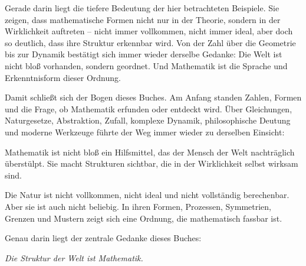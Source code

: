 Gerade darin liegt die tiefere Bedeutung der hier betrachteten Beispiele.
Sie zeigen,
dass mathematische Formen nicht nur in der Theorie,
sondern in der Wirklichkeit auftreten --
nicht immer vollkommen,
nicht immer ideal,
aber doch so deutlich,
dass ihre Struktur erkennbar wird.
Von der Zahl über die Geometrie bis zur Dynamik bestätigt sich immer wieder derselbe Gedanke:
Die Welt ist nicht bloß vorhanden,
sondern geordnet.
Und Mathematik ist die Sprache und Erkenntnisform dieser Ordnung.

\medskip

Damit schließt sich der Bogen dieses Buches.
Am Anfang standen Zahlen,
Formen
und die Frage,
ob Mathematik erfunden oder entdeckt wird.
Über Gleichungen,
Naturgesetze,
Abstraktion,
Zufall,
komplexe Dynamik,
philosophische Deutung
und moderne Werkzeuge führte der Weg immer wieder zu derselben Einsicht:

Mathematik ist nicht bloß ein Hilfsmittel,
das der Mensch der Welt nachträglich überstülpt.
Sie macht Strukturen sichtbar,
die in der Wirklichkeit selbst wirksam sind.

Die Natur ist nicht vollkommen,
nicht ideal
und nicht vollständig berechenbar.
Aber sie ist auch nicht beliebig.
In ihren Formen,
Prozessen,
Symmetrien,
Grenzen
und Mustern zeigt sich eine Ordnung,
die mathematisch fassbar ist.

Genau darin liegt der zentrale Gedanke dieses Buches:

\medskip

\begin{center}
	\emph{Die Struktur der Welt ist Mathematik.}
\end{center}